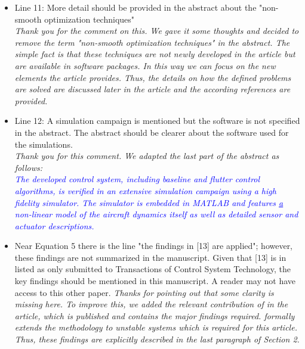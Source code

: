 \documentclass{article}
\begin{document}
\begin{itemize}
	\item Line 11: More detail should be provided in the abstract about the "non-smooth optimization techniques"\\
	\textit{Thank you for the comment on this. We gave it some thoughts and decided to remove the term "non-smooth optimization techniques" in the abstract. The simple fact is that these techniques are not newly developed in the article but are available in software packages. In this way we can focus on the new elements the article provides. Thus, the details on how the defined problems are solved are discussed later in the article and the according references are provided.}\\


	\item Line 12: A simulation campaign is mentioned but the software is not specified in the abstract.  The abstract should be clearer about the software used for the simulations.\\
	\textit{Thank you for this comment. We adapted the last part of the abstract as follows:}\\
	\textit{\textcolor{blue}{
	The developed control system, including baseline and flutter control algorithms, is verified in an extensive simulation campaign using a high fidelity simulator. The simulator is embedded in MATLAB and features \underline{a} non-linear model of the aircraft dynamics itself as well as detailed sensor and actuator descriptions.}}
	
	
	

	\item Near Equation 5 there is the line "the findings in [13] are applied"; however, these findings are not summarized in the manuscript.  Given that [13] is in listed as only submitted to Transactions of Control System Technology, the key findings should be mentioned in this manuscript.  A reader may not have access to this other paper.
	\textit{Thanks for pointing out that some clarity is missing here. To improve this, we added the relevant contribution of \cite{Pusch2018} in the article, which is published and contains the major findings required. \cite{Pusch18a} formally extends the methodology to unstable systems which is required for this article. Thus, these findings are explicitly described in the last paragraph of Section 2.}\\

	
	

\end{itemize}
\end{document}
